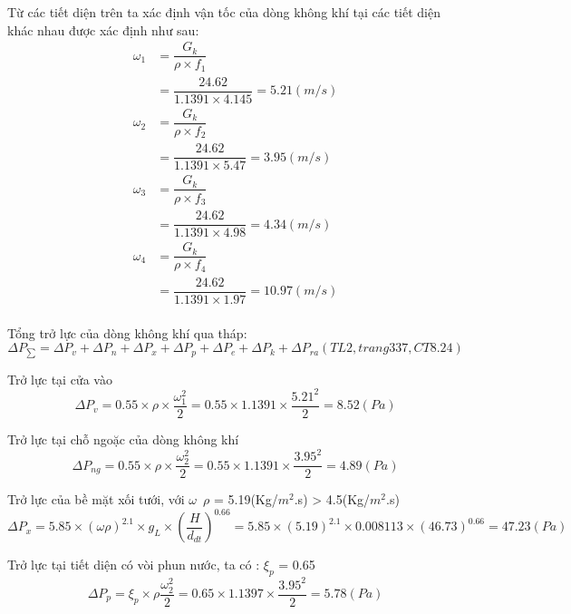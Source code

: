 Từ các tiết diện trên ta xác định vận tốc của dòng không khí tại các tiết diện khác nhau  được xác định như sau:
\begin{equation*}
	\begin{split}
		\omega_{1}& = \dfrac{G_{k}}{\rho \times f_{1}}\\ 
				  & = \dfrac{24.62}{1.1391 \times 4.145 } = 5.21(m/s)\\
		\omega_{2}& = \dfrac{G_{k}}{\rho \times f_{2}}\\ 
		& = \dfrac{24.62}{1.1391 \times 5.47 } = 3.95(m/s)\\
		\omega_{3}& = \dfrac{G_{k}}{\rho \times f_{3}}\\ 
		& = \dfrac{24.62}{1.1391 \times 4.98 } = 4.34(m/s)\\
		\omega_{4}& = \dfrac{G_{k}}{\rho \times f_{4}}\\ 
		& = \dfrac{24.62}{1.1391 \times 1.97 } = 10.97(m/s)\\
	\end{split}
\end{equation*}

Tổng trở lực của dòng không khí qua tháp:
\begin{equation*}
	\Delta P_{\sum} = \Delta P_{v} +\Delta P_{n} + \Delta P_{x} + \Delta P_{p} +\Delta P_{e} + \Delta P_{k} + \Delta P_{ra} (TL2, trang 337, CT 8.24)
\end{equation*}

Trở lực tại cửa vào
\begin{equation*}
	\Delta P_{v} = 0.55 \times \rho \times \dfrac{\omega_{1}^{2}}{2} = 0.55 \times 1.1391 \times \dfrac{5.21^2}{2} = 8.52(Pa)
\end{equation*}

Trở lực tại chỗ ngoặc của dòng không khí
\begin{equation*}
	\Delta P_{ng} = 0.55 \times \rho \times \dfrac{\omega_{2}^{2}}{2} = 0.55 \times 1.1391 \times \dfrac{3.95^2}{2} = 4.89(Pa)
\end{equation*}

Trở lực của bề mặt xối tưới, với $\omega$\ $\rho$ = 5.19(Kg/$m^2$.s) > 4.5(Kg/$m^2$.s)
\begin{equation*}
	\Delta P_{x} = 5.85 \times (\omega \rho)^{2.1}  \times g_{L} \times  (\dfrac{H}{d_{dt}})^{0.66} = 5.85 \times (5.19)^{2.1} \times 0.008113 \times (46.73)^{0.66} = 47.23(Pa)
\end{equation*}

Trở lực tại tiết diện có vòi phun nước, ta có : $\xi_{p}$ = 0.65
\begin{equation*}
	\Delta P_{p} = \xi_{p} \times \rho 
	\dfrac{\omega_{2}^2}{2} = 0.65 \times 1.1397 \times \dfrac{3.95^2}{2} = 5.78(Pa)
\end{equation*}

